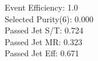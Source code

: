 Event Efficiency:   1.0\\ 
Selected Purity(6): 0.000\\ 
Passed Jet S/T:     0.724\\ 
Passed Jet MR:      0.323\\ 
Passed Jet Eff:     0.671